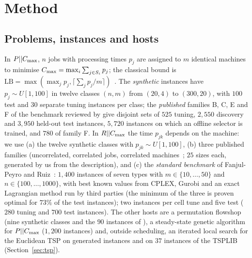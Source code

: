 \section{Method}
\label{sec:method}
\subsection{Problems, instances and hosts}
\label{sec:instances}
In $P||C_{\max}$, $n$ jobs with processing times $p_j$ are assigned to $m$ identical machines to minimise $C_{\max}=\max_i\sum_{j\in S_i}p_j$; the classical bound is $\mathrm{LB}=\max(\max_jp_j,\lceil\sum_jp_j/m\rceil)$~\cite{Graham1969}. The \emph{synthetic} instances have $p_j\sim U[1,100]$ in twelve classes $(n,m)$ from $(20,4)$ to $(300,20)$, with $100$ test and $30$ separate tuning instances per class; the \emph{published} families B, C, E and F of the benchmark reviewed by \citet{OstojicEtAl2025} give disjoint sets of $525$ tuning, $2{,}550$ discovery and $3{,}950$ held-out test instances, $5{,}720$ instances on which an offline selector is trained, and $780$ of family F. In $R||C_{\max}$ the time $p_{jk}$ depends on the machine: we use (a) the twelve synthetic classes with $p_{jk}\sim U[1,100]$, (b) three published families (uncorrelated, correlated jobs, correlated machines~\citep{AbladEtAl2021}; $25$ sizes each, generated by us from the description), and (c) the \emph{standard benchmark} of Fanjul-Peyro and Ruiz~\citep{FanjulPeyroRuiz2010}: $1{,}400$ instances of seven types with $m\in\{10,\dots,50\}$ and $n\in\{100,\dots,1000\}$, with best known values from CPLEX, Gurobi and an exact Lagrangian method run by third parties (the minimum of the three is proven optimal for $73\%$ of the test instances); two instances per cell tune and five test ($280$ tuning and $700$ test instances). The other hosts are a permutation flowshop (nine synthetic classes and the $90$ instances of \citet{Taillard1993}), a steady-state genetic algorithm for $P||C_{\max}$ ($1{,}200$ instances) and, outside scheduling, an iterated local search for the Euclidean TSP on generated instances and on $37$ instances of the TSPLIB (Section~\ref{sec:tsp}).

